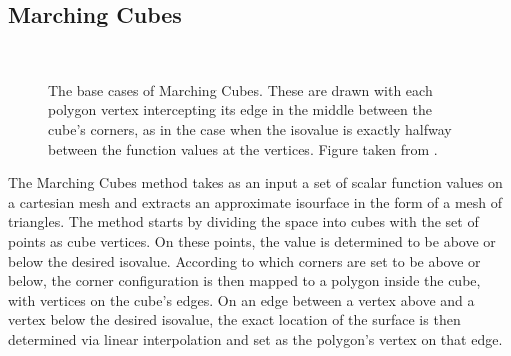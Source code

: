\subsection{Marching Cubes} 
\begin{figure}
\centering
   \\
   \caption{The base cases of Marching Cubes. These are drawn with each polygon vertex intercepting its edge in the middle between the cube's corners, as in the case when the isovalue is exactly halfway between the function values at the vertices. Figure taken from \cite{Marching2006}.}
   \label{fig:MC_basecase}
\end{figure}
The Marching Cubes method \cite{Marching2006} takes as an input a set of scalar function values on a cartesian mesh and extracts an approximate isourface in the form of a mesh of triangles. The method starts by dividing the space into cubes with the set of points as cube vertices. On these points, the value is determined to be above or below the desired isovalue. According to which corners are set to be above or below, the corner configuration is then mapped to a polygon inside the cube, with vertices on the cube's edges. On an edge between a vertex above and a vertex below the desired isovalue, the exact location of the surface is then determined via linear interpolation and set as the polygon's vertex on that edge.

